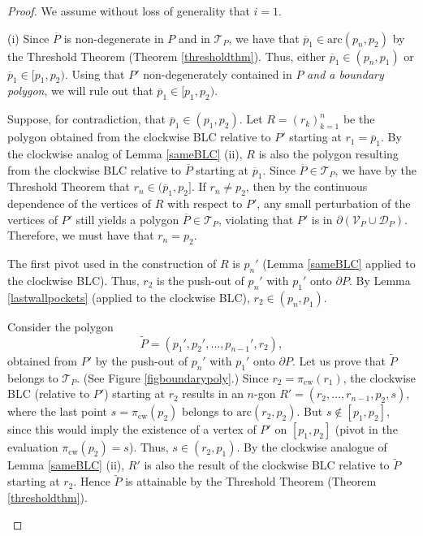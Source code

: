 \documentclass[11pt]{amsart}
\theoremstyle{remark}
\numberwithin{equation}{section}
\newcommand{\D}{\mathcal{D}}
\newcommand{\TT}{\mathcal{T}}
\newcommand{\V}{\mathcal{V}}
\newcommand{\arc}{\mathrm{arc}}
\newcommand{\cw}{\mathrm{cw}}
\begin{document}
\begin{proof}
We assume without loss of generality that $i=1$. 

(i) Since $\overline P$ is non-degenerate in $P$ and in $\TT_P$, we  have that $\overline p_1\in \arc(p_{n},p_2)$ by the Threshold Theorem (Theorem \ref{thresholdthm}). 
Thus, either $\overline p_1\in (p_n,p_1)$ or $\overline p_1\in [p_1,p_2)$. Using that $P'$ non-degenerately contained in $P$ \emph{and a boundary polygon}, 
we will rule out that $\overline p_1\in [p_1,p_2)$. 

Suppose, for  contradiction, that $\overline p_1 \in (p_1,p_2)$. Let $R=(r_k)_{k=1}^n$ be the polygon obtained from the clockwise BLC relative to $P'$ starting at $r_1=\overline p_1$.  By the clockwise analog of Lemma \ref{sameBLC} (ii), $R$ is also the  polygon resulting from the clockwise BLC relative to $\overline P$ starting at $\overline p_1$. Since $\overline P\in \TT_P$, we have by  the Threshold Theorem that $r_n\in (\overline p_1,p_2]$. 
If $r_n\neq p_2$, then by the continuous dependence of the vertices of $R$ with respect to $P'$, any small perturbation of the vertices of $P'$ still yields a  polygon $\overline P\in \TT_P$, violating that $P'$ is in $\partial (\V_P\cup\D_P)$. Therefore, we must have that $r_n=p_2$. 

The first pivot used in the construction of $R$ is $p_n'$ (Lemma \ref{sameBLC} applied to the clockwise BLC). Thus, $r_2$ is the push-out of $p_n'$ with $p_1'$ onto $\partial P$. By Lemma \ref{lastwallpockets} (applied to the clockwise BLC), $r_2\in (p_n,p_1)$.  

Consider the polygon
\[
\widetilde P= (p_1',p_2',\ldots,p_{n-1}',r_2),
\] 
obtained from $P'$ by the push-out of $p_n'$ with $p_1'$ onto $\partial P$.
Let us prove that $\widetilde P$ belongs to $\TT_P$. (See Figure \ref{figboundarypoly}.)
Since $r_2=\pi_{\cw}(r_1)$, the clockwise BLC (relative to $P'$) starting at $r_2$ results in an $n$-gon $R'=(r_2,\ldots,r_{n-1},p_2,s)$, where the last point $s=\pi_{\cw}(p_2)$ belongs to  $\arc(r_2,p_2)$. But $s\notin [p_1,p_2]$, since this would imply the existence of a vertex of $P'$ on $[p_1,p_2]$ (pivot in the evaluation $\pi_{\cw}(p_2)=s$). Thus, $s\in (r_2,p_1)$. By the clockwise analogue of Lemma \ref{sameBLC} (ii), $R'$ is also the result of the clockwise BLC relative to $\widetilde P$ starting at $r_2$. Hence $\widetilde P$ is attainable by the Threshold Theorem (Theorem \ref{thresholdthm}). 

\begin{figure}
\centering


\end{figure}
\end{proof}
\end{document}
